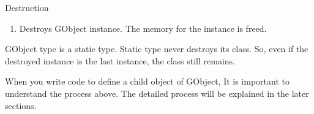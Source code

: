 Destruction

\begin{enumerate}
\def\labelenumi{\arabic{enumi}.}
\tightlist
\item
  Destroys GObject instance. The memory for the instance is freed.
\end{enumerate}

GObject type is a static type. Static type never destroys its class. So,
even if the destroyed instance is the last instance, the class still
remains.

When you write code to define a child object of GObject, It is important
to understand the process above. The detailed process will be explained
in the later sections.
